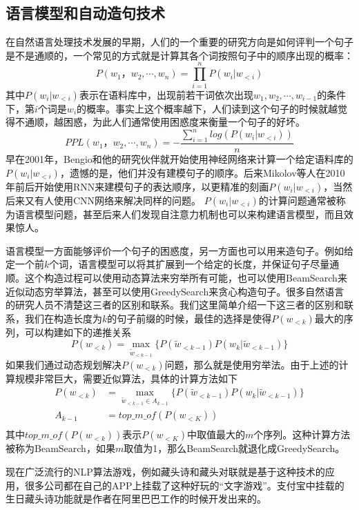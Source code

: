 \documentclass[twoside,a4paper,12pt]{book}%
\begin{document}
\subsection{语言模型和自动造句技术}
在自然语言处理技术发展的早期，人们的一个重要的研究方向是如何评判一个句子是不是通顺的，一个常见的方式就是计算其各个词按照句子中的顺序出现的概率：
$$
P(w_1，w_2,\cdots,w_n) = \prod_{i=1}^{n}{P(w_i|w_{<i})}
$$
其中$P(w_i|w_{<i})$表示在语料库中，出现前若干词依次出现$w_1,w_2,\cdots,w_{i-1}$的条件下，第$i$个词是$w_i$的概率。事实上这个概率越下，人们读到这个句子的时候就越觉得不通顺，越困惑，为此人们通常使用困惑度来衡量一个句子的好坏。
$$
PPL(w_1，w_2,\cdots,w_n) = -\frac{\sum_{i=1}^{n}log(P(w_i|w_{<i}))}{n}
$$
早在2001年，Bengio和他的研究伙伴就开始使用神经网络来计算一个给定语料库的$P(w_i|w_{<i})$，遗憾的是，他们并没有建模句子的顺序。后来Mikolov等人在2010年前后开始使用\gls{RNN}来建模句子的表达顺序，以更精准的刻画$P(w_i|w_{<i})$，当然后来又有人使用\gls{CNN}网络来解决同样的问题。
$P(w_i|w_{<i})$的计算问题通常被称为语言模型问题，甚至后来人们发现自注意力机制也可以来构建语言模型，而且效果惊人。

语言模型一方面能够评价一个句子的困惑度，另一方面也可以用来造句子。例如给定一个前$k$个词，语言模型可以将其扩展到一个给定的长度，并保证句子尽量通顺。这个构造过程可以使用动态算法来穷举所有可能，也可以使用BeamSearch来近似动态穷举算法，甚至可以使用GreedySearch来贪心构造句子。很多自然语言的研究人员不清楚这三者的区别和联系。我们这里简单介绍一下这三者的区别和联系，我们在构造长度为$k$的句子前缀的时候，最佳的选择是使得$P(w_{<k})$最大的序列，可以构建如下的递推关系
$$
P(w_{<{k}}) =\max_{\widetilde{w}_{<{k-1}}}\{P(\widetilde{w}_{<{k-1}})P(w_k|\widetilde{w}_{<{k-1}})\} 
$$
如果我们通过动态规划解决$P(w_{<k})$问题，那么就是使用穷举法。由于上述的计算规模非常巨大，需要近似算法，具体的计算方法如下
$$
\begin{aligned}
P(w_{<{k}}) &=\max_{\widetilde{w}_{<{k-1}}\in A_{k-1}}\{P(\widetilde{w}_{<{k-1}})P(w_k|\widetilde{w}_{<{k-1}})\} \\
A_{k-1} &=top\_m\_of(P(w_{<K}))\\
\end{aligned}
$$
其中$top\_m\_of(P(w_{<k}))$表示$P(w_{<K})$中取值最大的$m$个序列。这种计算方法被称为BeamSearch，如果$m$取值为1，那么BeamSearch就退化成GreedySearch。


现在广泛流行的\gls{NLP}算法游戏，例如藏头诗和藏头对联就是基于这种技术的应用，很多公司都在自己的APP上挂载了这种好玩的“文字游戏”。支付宝中挂载的生日藏头诗功能就是作者在阿里巴巴工作的时候开发出来的。
\end{document}
